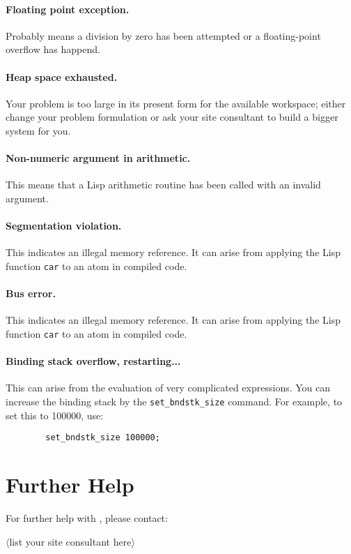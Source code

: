 \paragraph{Floating point exception.} Probably means a division by zero
has been attempted or a floating-point overflow has happend.

\paragraph{Heap space exhausted.} Your problem is too large in its present
form for the available workspace; either change your problem formulation
or ask your site consultant to build a bigger system for you.

\paragraph{Non-numeric argument in arithmetic.} This means that a Lisp
arithmetic routine has been called with an invalid argument.

\paragraph{Segmentation violation.} This indicates an illegal memory
reference.  It can arise from applying the Lisp function {\tt car} to an
atom in compiled code.

\paragraph{Bus error.} This indicates an illegal memory reference.  It
can arise from applying the Lisp function {\tt car} to an atom in compiled
code.

\paragraph{Binding stack overflow, restarting...} This can arise from 
the evaluation of
very complicated expressions. You can increase the binding stack by the
\verb|set_bndstk_size| command.  For example, to set this to 100000, use:
\begin{verbatim}
        set_bndstk_size 100000;
\end{verbatim}
\section{Further Help}
For further help with {\REDUCE}, please contact:
\begin{center}
$\langle$list your site consultant here$\rangle$
\end{center}


